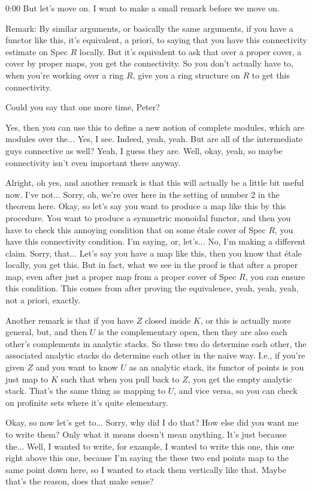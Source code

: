 \begin{unfinished}{0:00}
But let's move on. I want to make a small remark before we move on.

Remark: By similar arguments, or basically the same arguments, if you have a functor like this, it's equivalent, a priori, to saying that you have this connectivity estimate on Spec $R$ locally. But it's equivalent to ask that over a proper cover, a cover by proper maps, you get the connectivity. So you don't actually have to, when you're working over a ring $R$, give you a ring structure on $R$ to get this connectivity.

Could you say that one more time, Peter? 

Yes, then you can use this to define a new notion of complete modules, which are modules over the... Yes, I see. Indeed, yeah, yeah. But are all of the intermediate guys connective as well? Yeah, I guess they are. Well, okay, yeah, so maybe connectivity isn't even important there anyway.

Alright, oh yes, and another remark is that this will actually be a little bit useful now. I've not... Sorry, oh, we're over here in the setting of number 2 in the theorem here. Okay, so let's say you want to produce a map like this by this procedure. You want to produce a symmetric monoidal functor, and then you have to check this annoying condition that on some étale cover of Spec $R$, you have this connectivity condition. I'm saying, or, let's... No, I'm making a different claim. Sorry, that... Let's say you have a map like this, then you know that étale locally, you get this. But in fact, what we see in the proof is that after a proper map, even after just a proper map from a proper cover of Spec $R$, you can ensure this condition. This comes from after proving the equivalence, yeah, yeah, yeah, not a priori, exactly.

Another remark is that if you have $Z$ closed inside $K$, or this is actually more general, but, and then $U$ is the complementary open, then they are also each other's complements in analytic stacks. So these two do determine each other, the associated analytic stacks do determine each other in the naive way. I.e., if you're given $Z$ and you want to know $U$ as an analytic stack, its functor of points is you just map to $K$ such that when you pull back to $Z$, you get the empty analytic stack. That's the same thing as mapping to $U$, and vice versa, so you can check on profinite sets where it's quite elementary.

Okay, so now let's get to... Sorry, why did I do that? How else did you want me to write them? Only what it means doesn't mean anything. It's just because the... Well, I wanted to write, for example, I wanted to write this one, this one right above this one, because I'm saying the these two end points map to the same point down here, so I wanted to stack them vertically like that. Maybe that's the reason, does that make sense?


\end{unfinished}
